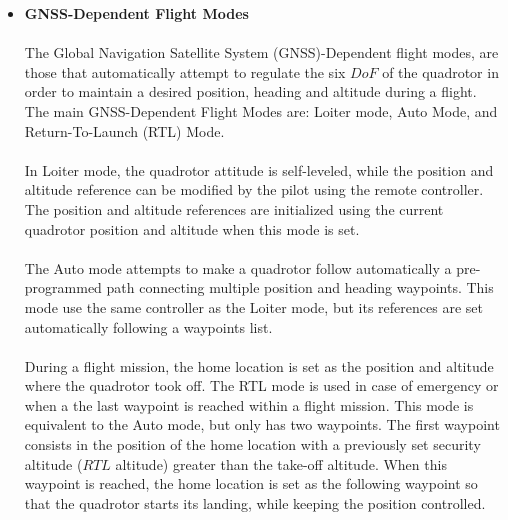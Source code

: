 \begin{itemize}
\item \textbf{GNSS-Dependent Flight Modes}\\\\
The Global Navigation Satellite System (GNSS)-Dependent flight modes, are those that automatically attempt to regulate the six $DoF$ of the quadrotor in order to maintain a desired position, heading and altitude during a flight. The main GNSS-Dependent Flight Modes are: Loiter mode, Auto Mode, and Return-To-Launch (RTL) Mode.
\\\\
In Loiter mode, the quadrotor attitude is self-leveled, while the position and altitude reference can be modified by the pilot using the remote controller. The position and altitude references are initialized using the current quadrotor position and altitude when this mode is set. 
\\\\
The Auto mode attempts to make a quadrotor follow automatically a pre-programmed path connecting multiple position and heading waypoints. This mode use the same controller as the Loiter mode, but its references are set automatically following a waypoints list. 
\\\\
During a flight mission, the home location is set as the position and altitude where the quadrotor took off. The RTL mode is used in case of emergency or when a the last waypoint is reached within a flight mission. This mode is equivalent to the Auto mode, but only has two waypoints. The first waypoint consists in the position of the home location with a previously set security altitude ($RTL$ altitude) greater than the take-off altitude. When this waypoint is reached, the home location is set as the following waypoint so that the quadrotor starts its landing, while keeping the position controlled.
\end{itemize}



